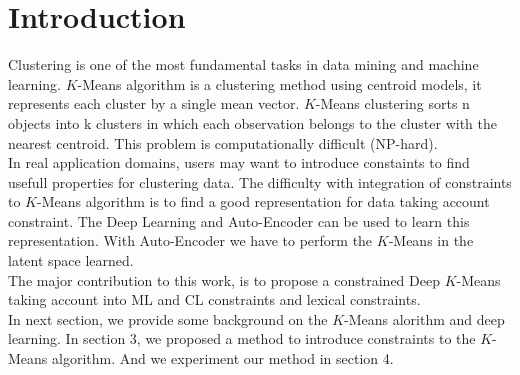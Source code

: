 
\section{Introduction}\label{sec:intro}

Clustering is one of the most fundamental tasks in data mining and machine
learning. $K$-Means algorithm is a clustering method using centroid models,
it represents each cluster by a single mean vector. $K$-Means clustering sorts
n objects into k clusters in which each observation belongs to
the cluster with the nearest centroid. This problem is computationally
difficult (NP-hard).
\\In real application domains, users may want to introduce constaints to find
usefull properties for clustering data. The difficulty with integration of
constraints to $K$-Means algorithm  is to find a good representation for data
taking account constraint. The Deep Learning and Auto-Encoder can be used to
learn this representation. With Auto-Encoder we have to perform the $K$-Means in
the latent space learned.
\\The major contribution to this work, is to propose a constrained Deep $K$-Means
taking account into ML and CL constraints and lexical constraints.
\\In next section, we provide some background on the $K$-Means alorithm and deep
learning. In section 3, we proposed a method to introduce constraints to the
$K$-Means algorithm. And we experiment our method in section 4.  
